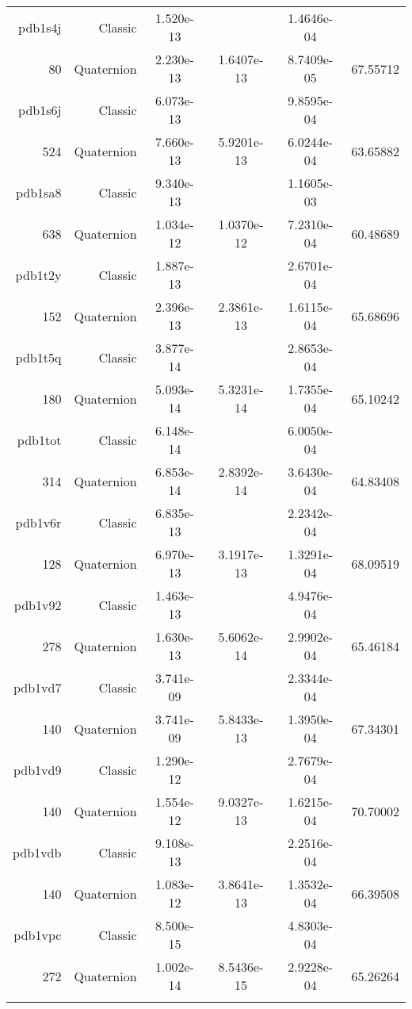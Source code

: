 \begin{xltabular}{\textwidth}{r|rS[table-format=1.3e+2]S[table-format=1.4e+2]S[table-format=1.4e+2]S[table-format=-1.5]}
pdb1s4j & Classic & 1.520e-13 &  & 1.4646e-04 & \\
80 & Quaternion & 2.230e-13 & 1.6407e-13 & 8.7409e-05 & 67.55712\\  \addlinespace
pdb1s6j & Classic & 6.073e-13 &  & 9.8595e-04 & \\
524 & Quaternion & 7.660e-13 & 5.9201e-13 & 6.0244e-04 & 63.65882\\  \addlinespace
pdb1sa8 & Classic & 9.340e-13 &  & 1.1605e-03 & \\
638 & Quaternion & 1.034e-12 & 1.0370e-12 & 7.2310e-04 & 60.48689\\  \addlinespace
pdb1t2y & Classic & 1.887e-13 &  & 2.6701e-04 & \\
152 & Quaternion & 2.396e-13 & 2.3861e-13 & 1.6115e-04 & 65.68696\\  \addlinespace
pdb1t5q & Classic & 3.877e-14 &  & 2.8653e-04 & \\
180 & Quaternion & 5.093e-14 & 5.3231e-14 & 1.7355e-04 & 65.10242\\  \addlinespace
pdb1tot & Classic & 6.148e-14 &  & 6.0050e-04 & \\
314 & Quaternion & 6.853e-14 & 2.8392e-14 & 3.6430e-04 & 64.83408\\  \addlinespace
pdb1v6r & Classic & 6.835e-13 &  & 2.2342e-04 & \\
128 & Quaternion & 6.970e-13 & 3.1917e-13 & 1.3291e-04 & 68.09519\\  \addlinespace
pdb1v92 & Classic & 1.463e-13 &  & 4.9476e-04 & \\
278 & Quaternion & 1.630e-13 & 5.6062e-14 & 2.9902e-04 & 65.46184\\  \addlinespace
pdb1vd7 & Classic & 3.741e-09 &  & 2.3344e-04 & \\
140 & Quaternion & 3.741e-09 & 5.8433e-13 & 1.3950e-04 & 67.34301\\  \addlinespace
pdb1vd9 & Classic & 1.290e-12 &  & 2.7679e-04 & \\
140 & Quaternion & 1.554e-12 & 9.0327e-13 & 1.6215e-04 & 70.70002\\  \addlinespace
pdb1vdb & Classic & 9.108e-13 &  & 2.2516e-04 & \\
140 & Quaternion & 1.083e-12 & 3.8641e-13 & 1.3532e-04 & 66.39508\\  \addlinespace
pdb1vpc & Classic & 8.500e-15 &  & 4.8303e-04 & \\
272 & Quaternion & 1.002e-14 & 8.5436e-15 & 2.9228e-04 & 65.26264\\  \addlinespace

\end{xltabular}
